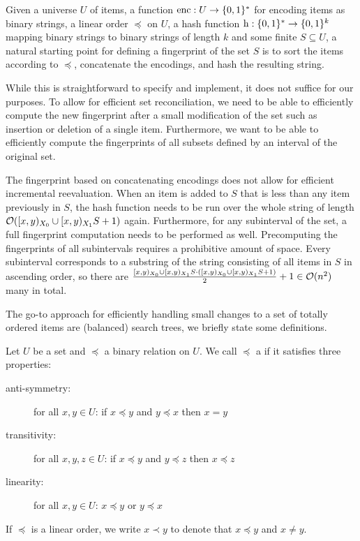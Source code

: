 Given a universe $U$ of items, a function $\operatorname{enc} : U \rightarrow \{0, 1\}^{*}$ for encoding items as binary strings, a linear order $\preceq$ on $U$, a hash function $\operatorname{h}: \{0, 1\}^{*} \rightarrow \{0, 1\}^{k}$ mapping binary strings to binary strings of length $k$ and some finite $S \subseteq U$, a natural starting point for defining a fingerprint of the set $S$ is to sort the items according to $\preceq$, concatenate the encodings, and hash the resulting string.

While this is straightforward to specify and implement, it does not suffice for our purposes. To allow for efficient set reconciliation, we need to be able to efficiently compute the new fingerprint after a small modification of the set such as insertion or deletion of a single item. Furthermore, we want to be able to efficiently compute the fingerprints of all subsets defined by an interval of the original set.

The fingerprint based on concatenating encodings does not allow for efficient incremental reevaluation. When an item is added to $S$ that is less than any item previously in $S$, the hash function needs to be run over the whole string of length $\mathcal{O}([{x},{y})_{X_0} \cup [{x},{y})_{X_1}{S} + 1)$ again. Furthermore, for any subinterval of the set, a full fingerprint computation needs to be performed as well. Precomputing the fingerprints of all subintervals requires a prohibitive amount of space. Every subinterval corresponds to a substring of the string consisting of all items in $S$ in ascending order, so there are $\frac{[{x},{y})_{X_0} \cup [{x},{y})_{X_1}{S} \cdot ([{x},{y})_{X_0} \cup [{x},{y})_{X_1}{S} + 1)}{2} + 1 \in \mathcal{O}(n^2)$ many in total.

The go-to approach for efficiently handling small changes to a set of totally ordered items are (balanced) search trees, we briefly state some definitions.

\begin{definition}
Let $U$ be a set and $\preceq$ a binary relation on $U$.
We call $\preceq$ a  if it satisfies three properties:

  \begin{description}
    \item[anti-symmetry:] for all $x, y \in U$: if $x \preceq y$ and $y \preceq x$ then $x = y$
    \item[transitivity:] for all $x, y, z \in U$: if $x \preceq y$ and $y \preceq z$ then $x \preceq z$
    \item[linearity:] for all $x, y \in U$: $x \preceq y$ or $y \preceq x$
  \end{description}

If $\preceq$ is a linear order, we write $x \prec y$ to denote that $x \preceq y$ and $x \neq y$.
\end{definition}

